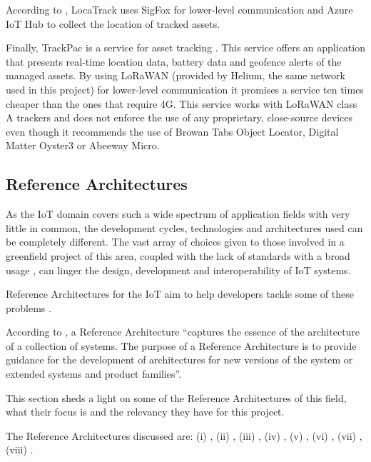According to \cite{safecube-azure}, LocaTrack uses SigFox for lower-level communication and Azure IoT Hub to collect the location of tracked assets.

Finally, TrackPac is a service for asset tracking \parencite{trackpac}. This service offers an application that presents real-time location data, battery data and geofence alerts of the managed assets. By using LoRaWAN (provided by Helium, the same network used in this project) for lower-level communication it promises a service ten times cheaper than the ones that require 4G. This service works with LoRaWAN class A trackers and does not enforce the use of any proprietary, close-source devices even though it recommends the use of Browan Tabs Object Locator, Digital Matter Oyster3 or Abeeway Micro. 

\subsection{Reference Architectures}
\label{subsec:stateofart:arch:ref}

As the \gls{IoT} domain covers such a wide spectrum of application fields with very little in common, the development cycles, technologies and architectures used can be completely different. The vast array of choices given to those involved in a greenfield project of this area, coupled with the lack of standards with a broad usage \parencite{DIAS2022100529, weyrich2015reference}, can linger the design, development and interoperability of \gls{IoT} systems.

Reference Architectures for the \gls{IoT} aim to help developers tackle some of these problems \parencite{weyrich2015reference}.

According to \cite{muller2008reference}, a Reference Architecture ``captures the essence of the architecture of a collection of systems. The purpose of a Reference Architecture is to provide guidance for the development of architectures for new versions of the system or extended systems and product families''.

This section sheds a light on some of the Reference Architectures of this field, what their focus is and the relevancy they have for this project.

The Reference Architectures discussed are: (i) , (ii) , (iii) , (iv) , (v) , (vi) , (vii) , (viii) .

